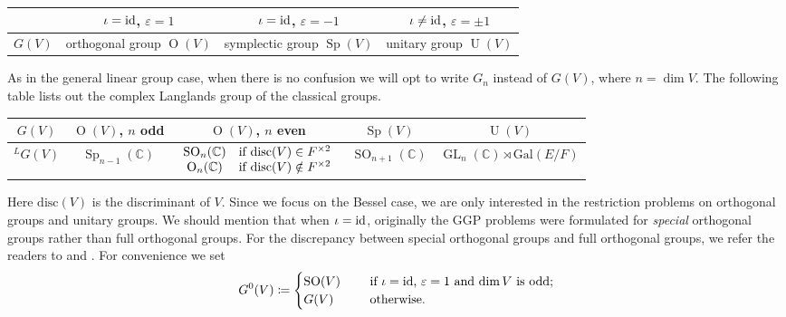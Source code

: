 \documentclass[11pt,letterpaper]{amsart}
\theoremstyle{plain}
\numberwithin{theorem}{section}
\numberwithin{equation}{subsection}
\theoremstyle{remark}
\newcommand{\GL}{\operatorname{GL}}
\newcommand{\SO}{\operatorname{SO}}
\newcommand{\rO}{\operatorname{O}}
\newcommand{\Sp}{\operatorname{Sp}}
\newcommand{\U}{\operatorname{U}}
\newcommand{\C}{\mathbb{C}}
\newcommand{\disc}{{\rm disc}}
\begin{document}
\vskip 5pt

\begin{center}
\begin{tabular}{|c|c|c|c|}
\hline
         & $\iota={\rm id}$, $\varepsilon=1$  & $\iota={\rm id}$, $\varepsilon=-1$  & $\iota\neq{\rm id}$, $\varepsilon=\pm1$ \\ \hline
\(G(V)\) & orthogonal group \(\rO(V)\) & symplectic group \(\Sp(V)\) & unitary group \(\U(V)\)                     \\ \hline
\end{tabular}
\end{center}
\vskip 5pt
As in the general linear group case, when there is no confusion we will opt to write \(G_n\) instead of \(G(V)\), where \(n=\dim V\). The following table lists out the complex Langlands group of the classical groups. %
\begin{center}
\begin{tabular}{|c|c|c|c|c|}
\hline
\(G(V)\) & \(\rO(V)\), $n$ odd & \(\rO(V)\), $n$ even & \(\Sp(V)\) & \(\U(V)\) \\\hline
\(^LG(V)\) & \(\Sp_{n-1}(\C)\) & $\begin{array}{cc}
\SO_n(\C) & \text{if } \disc(V) \in F^{\times 2}\\
\rO_n(\C) & \text{if } \disc(V) \notin F^{\times 2} 
\end{array}$ & \(\SO_{n+1}(\C)\) & \(\GL_n(\C)\rtimes\mathrm{Gal}(E/F)\)\\ \hline
\end{tabular}
\end{center}
\vskip 5pt
Here \(\mathrm{disc}(V)\) is the discriminant of \(V\). Since we focus on the Bessel case, we are only interested in the restriction problems on orthogonal groups and unitary groups. %
We should mention that when $\iota = {\rm id}$, originally the GGP problems were formulated for \emph{special} orthogonal groups rather than full orthogonal groups. For the discrepancy between special orthogonal groups and full orthogonal groups, we refer the readers to \cite[Sect. 2.5]{MR3788848} and \cite[Sect. 5.2]{MR3708200}. For convenience we set
\[
    G^0(V) \coloneqq \begin{cases}
     \SO(V) \quad & \text{ if $\iota={\rm id}$, $\varepsilon=1$ and $\dim V$ is odd};\\
     G(V) \quad & \text{ otherwise.}   
    \end{cases}
\]
\end{document}
